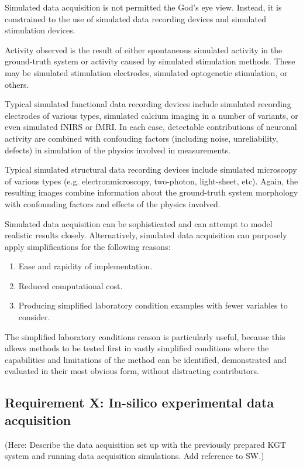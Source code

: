\documentclass{ldr-article}
\begin{document}
Simulated data acquisition is not permitted the God's eye view. Instead, it is constrained to the use of simulated data recording devices and simulated stimulation devices.

Activity observed is the result of either spontaneous simulated activity in the ground-truth system or activity caused by simulated stimulation methods. These may be simulated stimulation electrodes, simulated optogenetic stimulation, or others.

Typical simulated functional data recording devices include simulated recording electrodes of various types, simulated calcium imaging in a number of variants, or even simulated fNIRS or fMRI. In each case, detectable contributions of neuronal activity are combined with confouding factors (including noise, unreliability, defects) in simulation of the physics involved in measurements.

Typical simulated structural data recording devices include simulated microscopy of various types (e.g. electronmicroscopy, two-photon, light-sheet, etc). Again, the resulting images combine information about the ground-truth system morphology with confounding factors and effects of the physics involved.

Simulated data acquisition can be sophisticated and can attempt to model realistic results closely. Alternatively, simulated data acquisition can purposely apply simplifications for the following reasons:
\begin{enumerate}
	\item Ease and rapidity of implementation.
	\item Reduced computational cost.
	\item Producing simplified laboratory condition examples with fewer variables to consider.
\end{enumerate}
The simplified laboratory conditions reason is particularly useful, because this allows methods to be tested first in vastly simplified conditions where the capabilities and limitations of the method can be identified, demonstrated and evaluated in their most obvious form, without distracting contributors.

\subsection{Requirement X: In-silico experimental data acquisition}

(Here: Describe the data acquisition set up with the previously prepared KGT system and running data acquisition simulations. Add reference to SW.)
\end{document}
